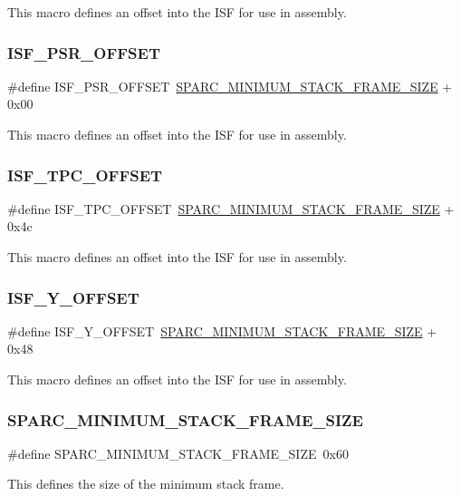 This macro defines an offset into the I\+SF for use in assembly. \mbox{\label{group__RTEMSScoreCPUSPARC_ga0bee4432eeecb5d6f29d6fbe5048382b}} 
\subsubsection{\texorpdfstring{ISF\_PSR\_OFFSET}{ISF\_PSR\_OFFSET}}
{\footnotesize\ttfamily \#define I\+S\+F\+\_\+\+P\+S\+R\+\_\+\+O\+F\+F\+S\+ET~\mbox{\hyperlink{group__RTEMSScoreCPUSPARC_ga8e296685f05588131b26bdc695cb9b8c}{S\+P\+A\+R\+C\+\_\+\+M\+I\+N\+I\+M\+U\+M\+\_\+\+S\+T\+A\+C\+K\+\_\+\+F\+R\+A\+M\+E\+\_\+\+S\+I\+ZE}} + 0x00}

This macro defines an offset into the I\+SF for use in assembly. \mbox{\label{group__RTEMSScoreCPUSPARC_gab1d2d78c3e9d2842262e527b7db82460}} 
\subsubsection{\texorpdfstring{ISF\_TPC\_OFFSET}{ISF\_TPC\_OFFSET}}
{\footnotesize\ttfamily \#define I\+S\+F\+\_\+\+T\+P\+C\+\_\+\+O\+F\+F\+S\+ET~\mbox{\hyperlink{group__RTEMSScoreCPUSPARC_ga8e296685f05588131b26bdc695cb9b8c}{S\+P\+A\+R\+C\+\_\+\+M\+I\+N\+I\+M\+U\+M\+\_\+\+S\+T\+A\+C\+K\+\_\+\+F\+R\+A\+M\+E\+\_\+\+S\+I\+ZE}} + 0x4c}

This macro defines an offset into the I\+SF for use in assembly. \mbox{\label{group__RTEMSScoreCPUSPARC_ga81c1c72501e6ead53235a54851e75ca8}} 
\subsubsection{\texorpdfstring{ISF\_Y\_OFFSET}{ISF\_Y\_OFFSET}}
{\footnotesize\ttfamily \#define I\+S\+F\+\_\+\+Y\+\_\+\+O\+F\+F\+S\+ET~\mbox{\hyperlink{group__RTEMSScoreCPUSPARC_ga8e296685f05588131b26bdc695cb9b8c}{S\+P\+A\+R\+C\+\_\+\+M\+I\+N\+I\+M\+U\+M\+\_\+\+S\+T\+A\+C\+K\+\_\+\+F\+R\+A\+M\+E\+\_\+\+S\+I\+ZE}} + 0x48}

This macro defines an offset into the I\+SF for use in assembly. \mbox{\label{group__RTEMSScoreCPUSPARC_ga8e296685f05588131b26bdc695cb9b8c}} 
\subsubsection{\texorpdfstring{SPARC\_MINIMUM\_STACK\_FRAME\_SIZE}{SPARC\_MINIMUM\_STACK\_FRAME\_SIZE}}
{\footnotesize\ttfamily \#define S\+P\+A\+R\+C\+\_\+\+M\+I\+N\+I\+M\+U\+M\+\_\+\+S\+T\+A\+C\+K\+\_\+\+F\+R\+A\+M\+E\+\_\+\+S\+I\+ZE~0x60}

This defines the size of the minimum stack frame. 